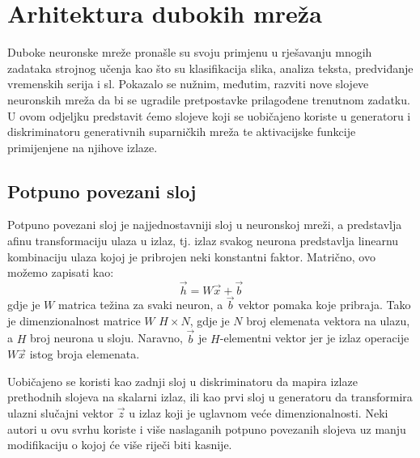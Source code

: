 \section{Arhitektura dubokih mreža}
Duboke neuronske mreže pronašle su svoju primjenu u rješavanju mnogih zadataka strojnog učenja kao što su klasifikacija slika, analiza teksta, predviđanje vremenskih serija i sl. Pokazalo se nužnim, međutim, razviti nove slojeve neuronskih mreža da bi se ugradile pretpostavke prilagođene trenutnom zadatku. U ovom odjeljku predstavit ćemo slojeve koji se uobičajeno koriste u generatoru i diskriminatoru generativnih suparničkih mreža te aktivacijske funkcije primijenjene na njihove izlaze.

\subsection{Potpuno povezani sloj}
Potpuno povezani sloj je najjednostavniji sloj u neuronskoj mreži, a predstavlja afinu transformaciju ulaza u izlaz, tj. izlaz svakog neurona predstavlja linearnu kombinaciju ulaza kojoj je pribrojen neki konstantni faktor. Matrično, ovo možemo zapisati kao:
\begin{equation}
\vec{h} = W\vec{x} + \vec{b}
\end{equation}
gdje je $W$ matrica težina za svaki neuron, a $\vec{b}$ vektor pomaka koje pribraja. Tako je dimenzionalnost matrice $W$ $H \times N$, gdje je $N$ broj elemenata vektora na ulazu, a $H$ broj neurona u sloju. Naravno, $\vec{b}$ je $H$-elementni vektor jer je izlaz operacije $W\vec{x}$ istog broja elemenata.

Uobičajeno se koristi kao zadnji sloj u diskriminatoru da mapira izlaze prethodnih slojeva na skalarni izlaz, ili kao prvi sloj u generatoru da transformira ulazni slučajni vektor $\vec{z}$ u izlaz koji je uglavnom veće dimenzionalnosti. Neki autori \citep{karras2019style} u ovu svrhu koriste i više naslaganih potpuno povezanih slojeva uz manju modifikaciju o kojoj će više riječi biti kasnije.

